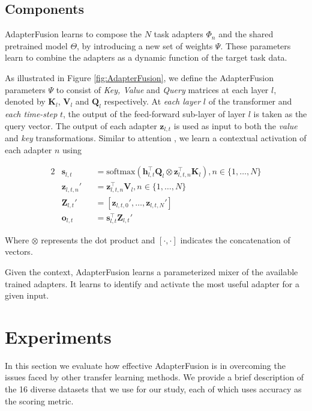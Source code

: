 \subsection{Components}
\label{sec:fusion:components}
AdapterFusion learns to compose the $N$ task adapters $\Phi_n$ and the shared pretrained model $\Theta$, by introducing a new set of weights $\Psi$.
These parameters learn to combine the adapters as a dynamic function of the target task data. 

As illustrated in Figure \ref{fig:AdapterFusion}, we define the AdapterFusion parameters $\Psi$ to consist of \textit{Key, Value} and \textit{Query} matrices at each layer $l$, denoted by $\textbf{K}_l$, $\textbf{V}_l$ and $\textbf{Q}_l$ respectively. At \emph{each layer} $l$ of the transformer and  \emph{each time-step} $t$, the output of the feed-forward sub-layer of layer $l$ is taken as the query vector. The output of each adapter $\textbf{z}_{l,t}$ is used as input to both the \textit{value} and \textit{key} transformations. Similar to attention \cite{Bahdanau14Attention, Vaswani17}, we learn a contextual activation of each adapter $n$ using

\begin{alignat*}{2}
    &\textbf{s}_{l,t} &&= \text{softmax}(\textbf{h}_{l,t}^\top\textbf{Q}_l \otimes \textbf{z}_{l,t,n}^\top\textbf{K}_l),  n\in\{1,{\scriptscriptstyle \ldots}, N\} 
\\
    &\textbf{z}_{l,t,n}' &&= \textbf{z}_{l,t,n}^\top\textbf{V}_l,  n\in\{1,{\scriptscriptstyle \ldots}, N\}
\\
    &\textbf{Z}_{l,t}' &&= [\textbf{z}_{l,t,0}', {\scriptscriptstyle \ldots} ,\textbf{z}_{l,t,N}']
\\
    &\textbf{o}_{l,t} &&= \textbf{s}_{l,t}^\top \textbf{Z}_{l,t}'
\end{alignat*}

Where $\otimes$ represents the dot product and $[\cdot, \cdot]$ indicates the concatenation of vectors.  

Given the context, AdapterFusion learns a parameterized mixer of the available trained adapters. It learns to identify and activate the most useful adapter for a given input. 

\section{Experiments}
\label{exp}

In this section we evaluate how effective AdapterFusion is in overcoming the issues faced by other transfer learning methods. We provide a brief description of the 16 diverse datasets that we use for our study, each of which uses accuracy as the scoring metric. 

